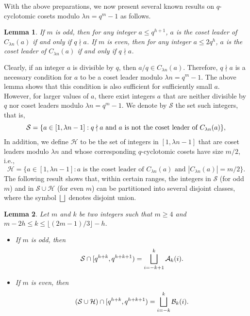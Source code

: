 \documentclass[journal,onecolumn]{IEEEtran}
\newtheorem{lemma}{Lemma}
\begin{document}
With the above preparations, we now present several known results on
$q$-cyclotomic cosets modulo $\lambda n = q^{m}-1$ as follows. 


\begin{lemma}\textnormal{\cite[Theorem~2.3]{YF2000}\label{lll}}
If $m$ is odd, then for any integer $a \le q^{h+1}$, $a$ is the coset
leader of $C_{\lambda n}(a)$ if and only if $q\nmid a$.
If $m$ is even, then for any integer $a \le 2q^{h}$, $a$ is the coset
leader of $C_{\lambda n}(a)$ if and only if $q\nmid a$.
\end{lemma}
Clearly, if an integer $a$ is divisible by $q$, then $a/q \in C_{\lambda n}(a)$. 
Therefore, $q \nmid a$ is a necessary condition for $a$ to be a coset leader modulo 
$\lambda n = q^m - 1$. 
The above lemma shows that this condition is also sufficient for sufficiently small $a$. However, for larger values of $a$, there exist integers $a$ that are neither divisible by $q$ nor coset leaders modulo $\lambda n = q^m - 1$.  
We denote by 
 $\mathcal{S}$  the set such integers, that is,  \begin{equation}\notag
\mathcal{S}=\{a\in [1,\lambda n-1] : q\nmid a \text{ and } a \text{ is not the coset leader of } C_{\lambda n}(a)\},
\end{equation}
In addition, we define $\mathcal{H}$ to be the set of integers in $[1,\lambda n-1]$ that are 
coset leaders modulo $\lambda n$ and whose corresponding $q$-cyclotomic cosets have size $m/2$, i.e.,
\begin{equation*}
\mathcal{H}
=\{a\in [1,\lambda n-1] : a \text{ is the coset leader of } C_{\lambda n}(a)
\text{ and } |C_{\lambda n}(a)|=m/2\}.
\end{equation*}
The following result shows that, within certain ranges, the integers in $\mathcal{S}$ (for odd $m$) 
and in $\mathcal{S}\cup\mathcal{H}$ (for even $m$) can be partitioned into several disjoint classes, where the symbol $\bigsqcup$ denotes disjoint union.
 
\begin{lemma}\textnormal{\cite[Theorem 2]{zheng2025}}\label{th2}
Let $m$ and $k$ be  two integers such that $m\geq 4$ and  $m-2h\leq k\leq   \lfloor (2m-1)/{3}\rfloor -h.$
\begin{itemize}
    \item 
If $m$ is odd,  then 
 \begin{equation}\notag
\mathcal{S}\cap [q^{h+k},q^{h+k+1})=\bigsqcup\limits_{i=-k+1}^k\mathcal{A}_k(i).
\end{equation}
\item If $m $ is  even,   
 then \begin{equation}\notag
(\mathcal{S}\cup \mathcal{H})\cap [q^{h+k},q^{h+k+1}) =\bigsqcup\limits_{i=-k}^k\mathcal{B}_k(i).
\end{equation}
\end{itemize}
\end{lemma}
\end{document}
